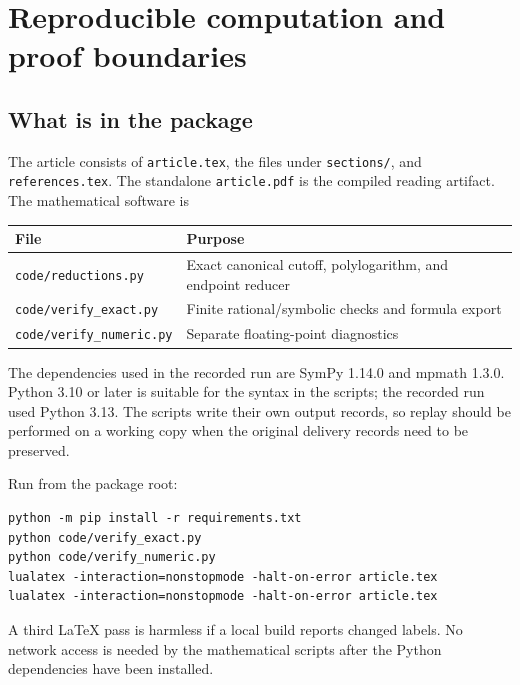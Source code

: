 \documentclass[11pt,letterpaper]{article}
\numberwithin{equation}{section}
\theoremstyle{definition}\newtheorem{definition}[theorem]{Definition}
\theoremstyle{remark}\newtheorem{remark}[theorem]{Remark}
\begin{document}

\appendix
\section{Reproducible computation and proof boundaries}
\label{dhr:sec:replay}

\subsection{What is in the package}
The article consists of \texttt{article.tex}, the files under
\texttt{sections/}, and \texttt{references.tex}. The standalone
\texttt{article.pdf} is the compiled reading artifact.
The mathematical software is
\begin{center}
\begin{tabular}{lp{}}
\toprule
File & Purpose\\
\midrule
\texttt{code/reductions.py} & Exact canonical cutoff, polylogarithm, and endpoint reducer\\
\texttt{code/verify\_exact.py} & Finite rational/symbolic checks and formula export\\
\texttt{code/verify\_numeric.py} & Separate floating-point diagnostics\\
\bottomrule
\end{tabular}
\end{center}
The dependencies used in the recorded run are SymPy 1.14.0 and mpmath
1.3.0. Python 3.10 or later is suitable for the syntax in the scripts;
the recorded run used Python 3.13. The scripts write their own output
records, so replay should be performed on a working copy when the
original delivery records need to be preserved.

Run from the package root:
\begin{verbatim}
python -m pip install -r requirements.txt
python code/verify_exact.py
python code/verify_numeric.py
lualatex -interaction=nonstopmode -halt-on-error article.tex
lualatex -interaction=nonstopmode -halt-on-error article.tex
\end{verbatim}
A third LaTeX pass is harmless if a local build reports changed labels.
No network access is needed by the mathematical scripts after the
Python dependencies have been installed.
\end{document}
